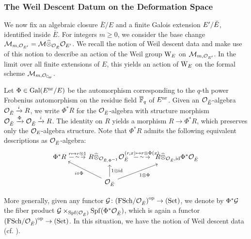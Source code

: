 \documentclass[../main.tex]{subfiles}
\begin{document}

\subsubsection{The Weil Descent Datum on the Deformation Space} %
\label{ssub:The Weil Descent Datum}
We now fix an algebraic closure
$\bar E/E$ and a finite Galois extension $E'/{\breve {E}}$, identified inside $\bar E$. 
For integers $m \geq 0$, we consider the base change $\mathcal{M}_{m, \mathcal{O}_{{E'}}} = \mathcal{M}
\widehat \otimes_{\mathcal{O}_{\breve {E}}} \mathcal{O}_{{E'}}$. 
We recall the notion of Weil descent data and make use of this notion to describe
an action of the Weil group $\mathrm W_E$ on $\mathcal{M}_{m, \mathcal{O}_{{E'}}}$. In the 
limit over all finite extensions of $E$, this yields an action of $\mathrm W_E$ on the
formal scheme $\cM_{m, \cO_{{\Cp}}}$.

Let $\Phi \in \operatorname{Gal}(E^{\mathrm{nr}} / E)$ be the automorphism corresponding to the
$q$-th power Frobenius automorphism on the residue field ${\overline {\mathbb{F}}_q}$ of $E^{\mathrm{nr}}$. Given
an $\mathcal{O}_{\breve {E}}$-algebra $\mathcal{O}_{\breve {E}} \xrightarrow{i} R$, we write $\Phi^*R$ for the 
$\mathcal{O}_{\breve {E}}$-algebra with structure morphism $\mathcal{O}_{\breve {E}} \xrightarrow{\Phi} \mathcal{O}_{\breve {E}} \xrightarrow{i} R$.
The identity on $R$ yields a morphism $R \to \Phi^* R$, which preserves only the 
$\mathcal{O}_E$-algebra structure. Note that $\Phi^* R$ admits the following equivalent
descriptions as $\mathcal{O}_{\breve {E}}$-algebra:
\begin{equation}\label{eq:PhiRDescription}
\begin{tikzcd}[ampersand replacement=\&]
	{\Phi^*R} \& {R \cotimes_{\cO_{\br E, \Phi^{-1}}}\cO_{\br E} \ } \& {\ R \cotimes_{\cO_{\br E}, \id} \Phi^*\cO_{\br E}} \\
	\& {\cO_{\br E}}
	\arrow["{r \mapsto r \otimes 1}", draw=none, from=1-1, to=1-2]
	\arrow["\sim"{description}, from=1-1, to=1-2]
	\arrow["{(r,x) \mapsto r \otimes\Phi(x)}", draw=none, from=1-2, to=1-3]
	\arrow["\sim"{description}, from=1-2, to=1-3]
	\arrow["{i \circ \Phi}", from=2-2, to=1-1]
	\arrow["{1 \otimes \id}"', from=2-2, to=1-2]
	\arrow["{1 \otimes \Phi}"', from=2-2, to=1-3]
\end{tikzcd}
\end{equation}

More generally, given any functor $\mathcal{G} \colon {(\mathrm{FSch}/{\mathcal{O}_{\breve {E}}})}^{\mathrm{op}} \to
{(\mathrm{Set})}$, we denote by
$\Phi^* \mathcal{G}$ the fiber product $\mathcal{G} \times_{\operatorname{Spf}(\mathcal{O}_{\breve {E}})} \operatorname{Spf}(\Phi^*
\mathcal{O}_{\breve {E}})$, which is again a functor ${(\mathrm{FSch}/{\mathcal{O}_{\breve {E}}})}^{\mathrm{op}} \to {(\mathrm{Set})}$.
In this situation, we have the notion of Weil descent data
(cf. \cite[Definition 3.45]{rapoport1996period}).
\end{document}
